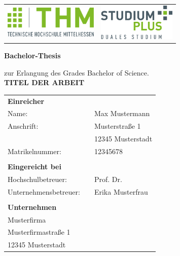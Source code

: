 \begin{titlepage}
    \begin{tabularx}{1\textwidth}{Xr}
        \includegraphics[height=1.5cm]{functional-pages/figures/thm-thm.pdf} & \includegraphics[height=1.75cm]{functional-pages/figures/thm-studiumplus.pdf} \\
    \end{tabularx}

    \vspace{15mm} %

    \begin{center}
        \large
        \textbf{Bachelor-Thesis}
        \large

        zur Erlangung des Grades Bachelor of Science.\\
        \vspace{15mm}
        \textbf{TITEL DER ARBEIT}
    \end{center}

    \vspace*{\fill} %

    \begin{center}
        \begin{tabular}{ p{5cm} l l }
            \textbf{Einreicher} & &\\
            Name: & & Max Mustermann\\
            Anschrift: & & Musterstraße 1\\
            & & 12345 Musterstadt\\
            Matrikelnummer: & & 12345678\\
            \tabularnewline
            \textbf{Eingereicht bei} & &\\
            Hochschulbetreuer: & & Prof. Dr. \\
            Unternehmensbetreuer: & & Erika Musterfrau\\
            \tabularnewline
            \textbf{Unternehmen} & &\\
            \multicolumn{3}{l}{Musterfirma}\\
            \multicolumn{3}{l}{Musterfirmastraße 1}\\
            \multicolumn{3}{l}{12345 Musterstadt}
        \end{tabular}


\end{center}
\end{titlepage}
